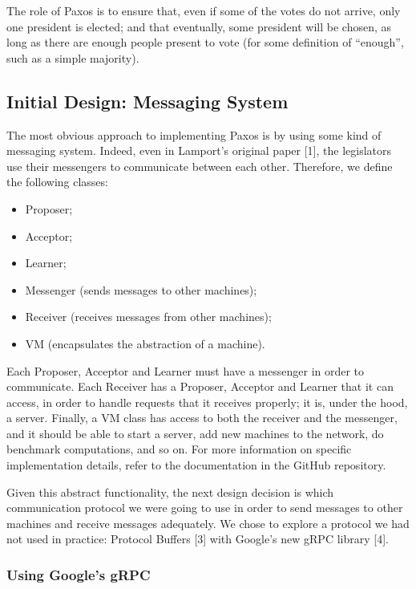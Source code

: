 \documentclass[12pt,]{article}
\providecommand{\tightlist}{%
  \setlength{\itemsep}{0pt}\setlength{\parskip}{0pt}}
\begin{document}
The role of Paxos is to ensure that, even if some of the votes do not
arrive, only one president is elected; and that eventually, some
president will be chosen, as long as there are enough people present to
vote (for some definition of ``enough'', such as a simple majority).

\subsection{Initial Design: Messaging
System}\label{initial-design-messaging-system}

The most obvious approach to implementing Paxos is by using some kind of
messaging system. Indeed, even in Lamport's original paper {[}1{]}, the
legislators use their messengers to communicate between each other.
Therefore, we define the following classes:

\begin{itemize}
\tightlist
\item
  Proposer;
\item
  Acceptor;
\item
  Learner;
\item
  Messenger (sends messages to other machines);
\item
  Receiver (receives messages from other machines);
\item
  VM (encapsulates the abstraction of a machine).
\end{itemize}

Each Proposer, Acceptor and Learner must have a messenger in order to
communicate. Each Receiver has a Proposer, Acceptor and Learner that it
can access, in order to handle requests that it receives properly; it
is, under the hood, a server. Finally, a VM class has access to both the
receiver and the messenger, and it should be able to start a server, add
new machines to the network, do benchmark computations, and so on. For
more information on specific implementation details, refer to the
documentation in the GitHub repository.

Given this abstract functionality, the next design decision is which
communication protocol we were going to use in order to send messages to
other machines and receive messages adequately. We chose to explore a
protocol we had not used in practice: Protocol Buffers {[}3{]} with
Google's new gRPC library {[}4{]}.

\subsubsection{Using Google's gRPC}\label{using-googles-grpc}
\end{document}
